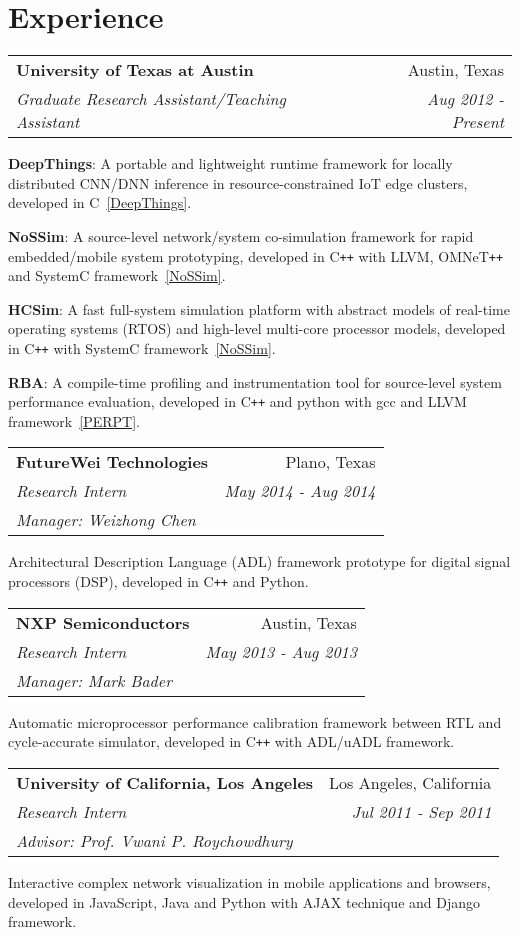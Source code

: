 \documentclass[letterpaper,11pt]{article}
\makeatletter
\def\plusplus{\texttt{++}\xspace}
\newcommand{\resumeItemList}[1]{
{\justifying
  \item{#1 \vspace{-6pt}}
\par}
}
\newcommand{\resumeItem}[2]{
{\justifying
  \item{
    \textbf{#1}{: #2 \vspace{-2pt}}
  }
\par}
}
\newcommand{\resumeSubheading}[4]{
  \vspace{-1pt}\item
    \begin{tabular*}{0.97\textwidth}[t]{l@{\extracolsep{\fill}}r}
      \textbf{#1} & #2 \\
      \textit{#3} & \textit{ #4} \\
    \end{tabular*}\vspace{-5pt}
}
\newcommand{\resumeSubheadingList}[5]{
  \vspace{-1pt}\item
    \begin{tabular*}{0.97\textwidth}[t]{l@{\extracolsep{\fill}}r}
      \textbf{#1} & #2 \\
      \textit{#3} & \textit{ #4} \\
      \textit{#5} &  \\
    \end{tabular*}\vspace{-5pt}
}
\newcommand{\resumeSubHeadingListStart}{\begin{itemize}[leftmargin=*]}
\newcommand{\resumeSubHeadingListEnd}{\end{itemize}}
\newcommand{\resumeItemListStart}{\begin{itemize}}
\newcommand{\resumeItemListEnd}{\end{itemize}\vspace{-5pt}}
\makeatother
\begin{document}
\section{Experience}
  \resumeSubHeadingListStart
    \resumeSubheading
      {University of Texas at Austin}{Austin, Texas}
      {Graduate Research Assistant/Teaching Assistant}{Aug 2012 - Present}
      \resumeItemListStart
        \resumeItem{DeepThings}
          {A portable and lightweight runtime framework for locally distributed CNN/DNN inference in resource-constrained IoT edge clusters, developed in C~\ref{DeepThings}.}
        \resumeItem{NoSSim}
          {A source-level network/system co-simulation framework for rapid embedded/mobile system prototyping, developed in C\plusplus with LLVM, OMNeT\plusplus and SystemC framework~\ref{NoSSim}.}
        \resumeItem{HCSim}
          {A fast full-system simulation platform with abstract models of real-time operating systems (RTOS) and high-level multi-core processor models, developed in C\plusplus with SystemC framework~\ref{NoSSim}.}
        \resumeItem{RBA}
          {A compile-time profiling and instrumentation tool for source-level system performance evaluation, developed in C\plusplus and python with gcc and LLVM framework~\ref{PERPT}.}
      \resumeItemListEnd
  \resumeSubHeadingListEnd
\vspace{-5pt}
  \resumeSubHeadingListStart
    \resumeSubheadingList
      {FutureWei Technologies}{Plano, Texas}
      {Research Intern}{May 2014 - Aug 2014}
      {Manager: Weizhong Chen}
      \resumeItemListStart
        \resumeItemList{Architectural Description Language (ADL) framework prototype for digital signal processors (DSP), developed in C\plusplus and Python.}
      \resumeItemListEnd
  \resumeSubHeadingListEnd
\vspace{-5pt}
  \resumeSubHeadingListStart
    \resumeSubheadingList
      {NXP Semiconductors}{Austin, Texas}
      {Research Intern}{May 2013 - Aug 2013}
      {Manager: Mark Bader}
      \resumeItemListStart
        \resumeItemList{Automatic microprocessor performance calibration framework between RTL and cycle-accurate simulator, developed in C\plusplus with ADL/uADL framework.}
      \resumeItemListEnd
  \resumeSubHeadingListEnd
\vspace{-5pt}
  \resumeSubHeadingListStart
    \resumeSubheadingList
      {University of California, Los Angeles}{Los Angeles, California}
      {Research Intern}{Jul 2011 - Sep 2011}
      {Advisor: Prof. Vwani P. Roychowdhury}
      \resumeItemListStart
        \resumeItemList{Interactive complex network visualization in mobile applications and browsers, developed in JavaScript, Java and Python with AJAX technique and Django framework.}
      \resumeItemListEnd
  \resumeSubHeadingListEnd
\end{document}

